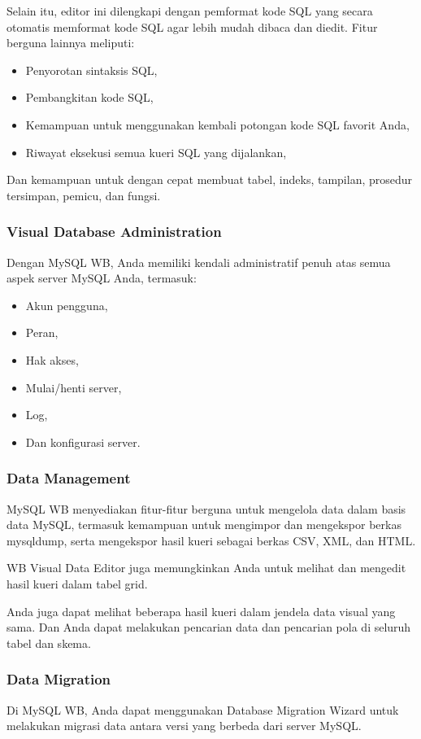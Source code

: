\documentclass{article}
\begin{document}
Selain itu, editor ini dilengkapi dengan pemformat kode SQL yang secara otomatis memformat kode SQL agar lebih mudah dibaca dan diedit. Fitur berguna lainnya meliputi:
\begin{itemize}
    \item Penyorotan sintaksis SQL,
    \item Pembangkitan kode SQL,
    \item Kemampuan untuk menggunakan kembali potongan kode SQL favorit Anda,
    \item Riwayat eksekusi semua kueri SQL yang dijalankan,
\end{itemize}

Dan kemampuan untuk dengan cepat membuat tabel, indeks, tampilan, prosedur tersimpan, pemicu, dan fungsi.

\subsubsection{Visual Database Administration}
Dengan MySQL WB, Anda memiliki kendali administratif penuh atas semua aspek server MySQL Anda, termasuk:
\begin{itemize}
    \item Akun pengguna,
    \item Peran,
    \item Hak akses,
    \item Mulai/henti server,
    \item Log,
    \item Dan konfigurasi server.
\end{itemize}

\subsubsection{Data Management}
MySQL WB menyediakan fitur-fitur berguna untuk mengelola data dalam basis data MySQL, termasuk kemampuan untuk mengimpor dan mengekspor berkas mysqldump, serta mengekspor hasil kueri sebagai berkas CSV, XML, dan HTML.

WB Visual Data Editor juga memungkinkan Anda untuk melihat dan mengedit hasil kueri dalam tabel grid.

Anda juga dapat melihat beberapa hasil kueri dalam jendela data visual yang sama. Dan Anda dapat melakukan pencarian data dan pencarian pola di seluruh tabel dan skema.

\subsubsection{Data Migration}
Di MySQL WB, Anda dapat menggunakan Database Migration Wizard untuk melakukan migrasi data antara versi yang berbeda dari server MySQL.
\end{document}
